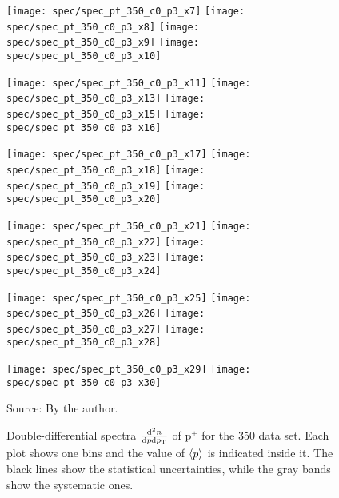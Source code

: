 \begin{figure}[!ht]
  \centering

  \texttt{[image: spec/spec\_pt\_350\_c0\_p3\_x7]}
  \texttt{[image: spec/spec\_pt\_350\_c0\_p3\_x8]}
  \texttt{[image: spec/spec\_pt\_350\_c0\_p3\_x9]}
  \texttt{[image: spec/spec\_pt\_350\_c0\_p3\_x10]}

  \texttt{[image: spec/spec\_pt\_350\_c0\_p3\_x11]}
  \texttt{[image: spec/spec\_pt\_350\_c0\_p3\_x13]}
  \texttt{[image: spec/spec\_pt\_350\_c0\_p3\_x15]}
  \texttt{[image: spec/spec\_pt\_350\_c0\_p3\_x16]}

  \texttt{[image: spec/spec\_pt\_350\_c0\_p3\_x17]}
  \texttt{[image: spec/spec\_pt\_350\_c0\_p3\_x18]}
  \texttt{[image: spec/spec\_pt\_350\_c0\_p3\_x19]}
  \texttt{[image: spec/spec\_pt\_350\_c0\_p3\_x20]}

  \texttt{[image: spec/spec\_pt\_350\_c0\_p3\_x21]}
  \texttt{[image: spec/spec\_pt\_350\_c0\_p3\_x22]}
  \texttt{[image: spec/spec\_pt\_350\_c0\_p3\_x23]}
  \texttt{[image: spec/spec\_pt\_350\_c0\_p3\_x24]}

  \texttt{[image: spec/spec\_pt\_350\_c0\_p3\_x25]}
  \texttt{[image: spec/spec\_pt\_350\_c0\_p3\_x26]}
  \texttt{[image: spec/spec\_pt\_350\_c0\_p3\_x27]}
  \texttt{[image: spec/spec\_pt\_350\_c0\_p3\_x28]}

  \texttt{[image: spec/spec\_pt\_350\_c0\_p3\_x29]}
  \texttt{[image: spec/spec\_pt\_350\_c0\_p3\_x30]}
 
  \caption{Double-differential spectra $\frac{\text{d}^2n}{\text{d}p\text{d}p_\text{T}}$
    of p$^+$ for the 350 \GeVc data set. Each plot shows one \pp bins and the value
    of $\langle p\rangle$ is indicated inside it. The black lines show the statistical
    uncertainties, while the gray bands show the systematic ones.}
  \label{fig:hadron:spec:dedx:all350:c0p3}
  \begin{center}
    \small Source: By the author. 
  \end{center}
\end{figure}

